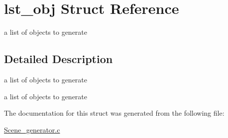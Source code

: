 \hypertarget{structlst__obj}{}\section{lst\+\_\+obj Struct Reference}
\label{structlst__obj}


a list of objects to generate  




\subsection{Detailed Description}
a list of objects to generate 

a list of objects to generate 

The documentation for this struct was generated from the following file\+:\begin{DoxyCompactItemize}
\item 
\hyperlink{_scene__generator_8c}{Scene\+\_\+generator.\+c}\end{DoxyCompactItemize}
